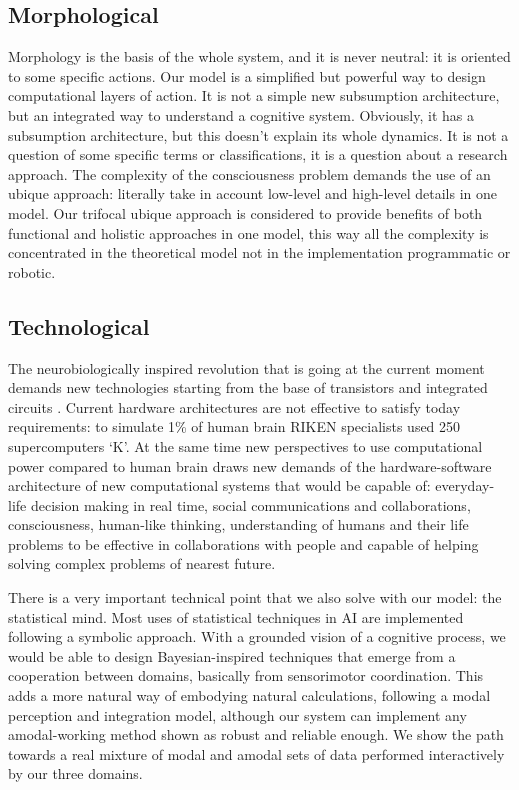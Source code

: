 \subsection{Morphological}\label{morphological}

Morphology is the basis of the whole system, and it is never neutral: it
is oriented to some specific actions. Our model is a simplified but
powerful way to design computational layers of action. It is not a
simple new subsumption architecture, but an integrated way to understand
a cognitive system. Obviously, it has a subsumption architecture, but
this doesn't explain its whole dynamics. It is not a question of some
specific terms or classifications, it is a question about a research
approach. The complexity of the consciousness problem demands the use of
an ubique approach: literally take in account low-level and high-level
details in one model. Our trifocal ubique approach is considered to
provide benefits of both functional and holistic approaches in one
model, this way all the complexity is concentrated in the theoretical
model not in the implementation programmatic or robotic.

\subsection{Technological}\label{technological}

The neurobiologically inspired revolution that is going at the current
moment demands new technologies starting from the base of transistors
and integrated circuits \cite{neurocomputing}. Current hardware
architectures are not effective to satisfy today requirements: to
simulate 1\% of human brain RIKEN specialists used 250 supercomputers
`K'\cite{RIKEN}. At the same time new perspectives to use computational
power compared to human brain draws new demands of the hardware-software
architecture of new computational systems that would be capable of:
everyday-life decision making in real time, social communications and
collaborations, consciousness, human-like thinking, understanding of
humans and their life problems to be effective in collaborations with
people and capable of helping solving complex problems of nearest
future.

There is a very important technical point that we also solve with our
model: the statistical mind. Most uses of statistical techniques in AI
are implemented following a symbolic approach. With a grounded vision of
a cognitive process, we would be able to design Bayesian-inspired
techniques that emerge from a cooperation between domains, basically
from sensorimotor coordination. This adds a more natural way of
embodying natural calculations, following a modal perception and
integration model, although our system can implement any amodal-working
method shown as robust and reliable enough. We show the path towards a
real mixture of modal and amodal sets of data performed interactively by
our three domains.

